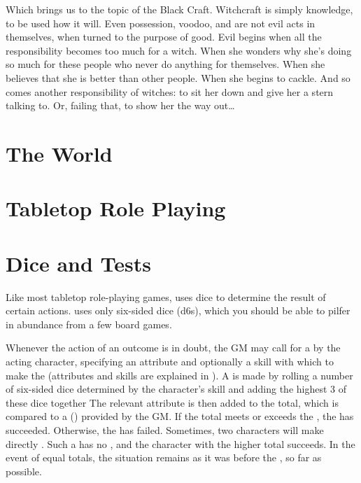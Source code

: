 Which brings us to the topic of the Black Craft.
Witchcraft is simply knowledge, to be used how it will.
Even possession, voodoo, and  are not evil acts in themselves, when turned to the purpose of good. %
Evil begins when all the responsibility becomes too much for a witch.
When she wonders why she's doing so much for these people who never do anything for themselves.
When she believes that she is better than other people.
When she begins to cackle.
And so comes another responsibility of witches: to sit her down and give her a stern talking to.
Or, failing that, to show her the way out{\dots}

\section{The World}


\section{Tabletop Role Playing}

\section{Dice and Tests}

Like most tabletop role-playing games,  uses dice to determine the result of certain actions.
 uses only six-sided dice (d6s), which you should be able to pilfer in abundance from a few board games.

Whenever the action of an outcome is in doubt, the GM may call for a {\test} by the acting character, specifying an attribute and optionally a skill with which to make the {\test} (attributes and skills are explained in ).
A {\test} is made by rolling a number of six-sided dice determined by the character's skill and adding the highest 3 of these dice together
The relevant attribute is then added to the total, which is compared to a {\targetnumber} ({\tn}) provided by the GM.
If the total meets or exceeds the {\tn}, the {\test} has succeeded.
Otherwise, the {\test} has failed.
Sometimes, two characters will make directly {\opposed} {\tests}.
Such a {\test} has no {\tn}, and the character with the higher total succeeds.
In the event of equal totals, the situation remains as it was before the {\test}, so far as possible.

